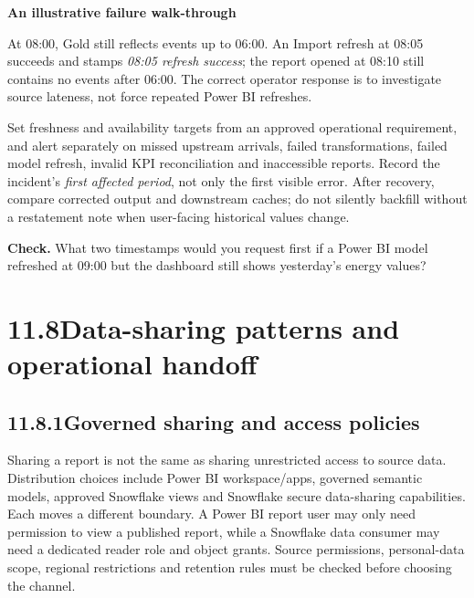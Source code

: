 \documentclass[11pt,twoside]{article}
\newcommand{\topic}[2]{\subsection*{#1\quad #2}}
\begin{document}
\begin{whitebox}\textbf{An illustrative failure walk-through}\par
At 08:00, Gold still reflects events up to 06:00. An Import refresh at 08:05 succeeds and stamps \emph{08:05 refresh success}; the report opened at 08:10 still contains no events after 06:00. The correct operator response is to investigate source lateness, not force repeated Power BI refreshes.\end{whitebox}
Set freshness and availability targets from an approved operational requirement, and alert separately on missed upstream arrivals, failed transformations, failed model refresh, invalid KPI reconciliation and inaccessible reports. Record the incident's \emph{first affected period}, not only the first visible error. After recovery, compare corrected output and downstream caches; do not silently backfill without a restatement note when user-facing historical values change.

\textbf{Check.} What two timestamps would you request first if a Power BI model refreshed at 09:00 but the dashboard still shows yesterday's energy values?
\newpage
\section*{11.8\quad Data-sharing patterns and operational handoff}
\topic{11.8.1}{Governed sharing and access policies}
Sharing a report is not the same as sharing unrestricted access to source data. Distribution choices include Power BI workspace/apps, governed semantic models, approved Snowflake views and Snowflake secure data-sharing capabilities. Each moves a different boundary. A Power BI report user may only need permission to view a published report, while a Snowflake data consumer may need a dedicated reader role and object grants. Source permissions, personal-data scope, regional restrictions and retention rules must be checked before choosing the channel.
\end{document}
